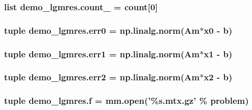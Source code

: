 \subsubsection[{count\+\_\+2}]{\setlength{\rightskip}{0pt plus 5cm}list demo\+\_\+lgmres.\+count\+\_ = {\bf count}\mbox{[}0\mbox{]}}\label{namespacedemo__lgmres_a0b2db09bcc33bd61438fb32ca0a26a40}
\hypertarget{namespacedemo__lgmres_a857086fbd9bf98d9f6f130668505c223}{}
\subsubsection[{err0}]{\setlength{\rightskip}{0pt plus 5cm}tuple demo\+\_\+lgmres.\+err0 = {\bf np.\+linalg.\+norm}({\bf Am}$\ast${\bf x0} -\/ {\bf b})}\label{namespacedemo__lgmres_a857086fbd9bf98d9f6f130668505c223}
\hypertarget{namespacedemo__lgmres_a2f863624b97cb465b89e233597552785}{}
\subsubsection[{err1}]{\setlength{\rightskip}{0pt plus 5cm}tuple demo\+\_\+lgmres.\+err1 = {\bf np.\+linalg.\+norm}({\bf Am}$\ast${\bf x1} -\/ {\bf b})}\label{namespacedemo__lgmres_a2f863624b97cb465b89e233597552785}
\hypertarget{namespacedemo__lgmres_ad5543132fd6bde236c12e53d812dc2ff}{}
\subsubsection[{err2}]{\setlength{\rightskip}{0pt plus 5cm}tuple demo\+\_\+lgmres.\+err2 = {\bf np.\+linalg.\+norm}({\bf Am}$\ast${\bf x2} -\/ {\bf b})}\label{namespacedemo__lgmres_ad5543132fd6bde236c12e53d812dc2ff}
\hypertarget{namespacedemo__lgmres_acf69589796371cd6bf3c673ea0ab23ac}{}
\subsubsection[{f}]{\setlength{\rightskip}{0pt plus 5cm}tuple demo\+\_\+lgmres.\+f = mm.\+open('\%s.\+mtx.\+gz' \% {\bf problem})}\label{namespacedemo__lgmres_acf69589796371cd6bf3c673ea0ab23ac}
\hypertarget{namespacedemo__lgmres_a2ec1c24106943f3ecb84af982a6fee3f}{}
